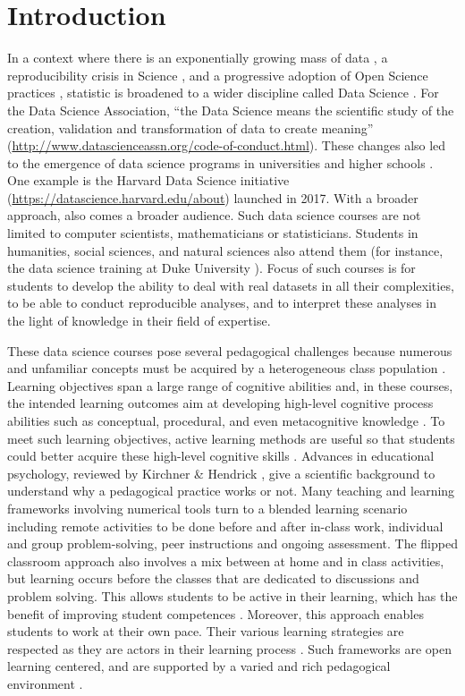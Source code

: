\documentclass{aims}
\theoremstyle{definition}
\begin{document}
\hypertarget{introduction}{%
\section{Introduction}\label{introduction}}

In a context where there is an exponentially growing mass of data
\cite{Marx2013}, a reproducibility crisis in Science \cite{Baker2016},
and a progressive adoption of Open Science practices \cite{Banks2019},
statistic is broadened to a wider discipline called Data Science
\cite{Cleveland2001}. For the Data Science Association, ``the Data
Science means the scientific study of the creation, validation and
transformation of data to create meaning''
(\url{http://www.datascienceassn.org/code-of-conduct.html}). These
changes also led to the emergence of data science programs in
universities and higher schools \cite{Donoho2017, Cetinkaya-Rundel2021}.
One example is the Harvard Data Science initiative
(\url{https://datascience.harvard.edu/about}) launched in 2017. With a
broader approach, also comes a broader audience. Such data science
courses are not limited to computer scientists, mathematicians or
statisticians. Students in humanities, social sciences, and natural
sciences also attend them (for instance, the data science training at
Duke University \cite{Cetinkaya-Rundel2021}). Focus of such courses is
for students to develop the ability to deal with real datasets in all
their complexities, to be able to conduct reproducible analyses, and to
interpret these analyses in the light of knowledge in their field of
expertise.

These data science courses pose several pedagogical challenges because
numerous and unfamiliar concepts must be acquired by a heterogeneous
class population \cite{Guzman2019}. Learning objectives span a large
range of cognitive abilities and, in these courses, the intended
learning outcomes aim at developing high-level cognitive process
abilities such as conceptual, procedural, and even metacognitive
knowledge \cite{Krathwohl2002}. To meet such learning objectives, active
learning methods are useful so that students could better acquire these
high-level cognitive skills \cite{Freeman2014}. Advances in educational
psychology, reviewed by Kirchner \& Hendrick \cite{Kirschner2020}, give
a scientific background to understand why a pedagogical practice works
or not. Many teaching and learning frameworks involving numerical tools
turn to a blended learning scenario including remote activities to be
done before and after in-class work, individual and group
problem-solving, peer instructions and ongoing assessment. The flipped
classroom approach also involves a mix between at home and in class
activities, but learning occurs before the classes that are dedicated to
discussions and problem solving. This allows students to be active in
their learning, which has the benefit of improving student competences
\cite{Freeman2014}. Moreover, this approach enables students to work at
their own pace. Their various learning strategies are respected as they
are actors in their learning process \cite{Spadafora2018}. Such
frameworks are open learning centered, and are supported by a varied and
rich pedagogical environment \cite{Burton2011}.
\end{document}
